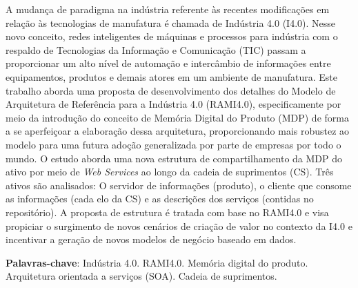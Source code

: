 \setlength{\absparsep}{18pt} %
\begin{resumo}
	A mudança de paradigma na indústria referente às recentes modificações em relação às tecnologias de manufatura é chamada de Indústria 4.0 (I4.0). Nesse novo conceito, redes inteligentes de máquinas e processos para indústria com o respaldo de Tecnologias da Informação e Comunicação (TIC) passam a proporcionar um alto nível de automação e intercâmbio de informações entre equipamentos, produtos e demais atores em um ambiente de manufatura.
	Este trabalho aborda uma proposta de desenvolvimento dos detalhes do Modelo de Arquitetura de Referência para a Indústria 4.0 (RAMI4.0), especificamente por meio da introdução do conceito de Memória Digital do Produto (MDP) de forma a se aperfeiçoar a elaboração dessa arquitetura, proporcionando mais robustez ao modelo para uma futura adoção generalizada por parte de empresas por todo o mundo.
	O estudo aborda uma nova estrutura de compartilhamento da MDP do ativo por meio de \textit{Web Services} ao longo da cadeia de suprimentos (CS). Três ativos são analisados: O servidor de informações (produto), o cliente que consome as informações (cada elo da CS) e as descrições dos serviços (contidas no repositório).
	A proposta de estrutura é tratada com base no RAMI4.0 e visa propiciar o surgimento de novos cenários de criação de valor no contexto da I4.0 e incentivar a geração de novos modelos de negócio baseado em dados.
	
	\vspace{\onelineskip}
	
	\noindent
	\textbf{Palavras-chave}: Indústria 4.0. RAMI4.0. Memória digital do produto. Arquitetura orientada a serviços (SOA). Cadeia de suprimentos.
\end{resumo}


